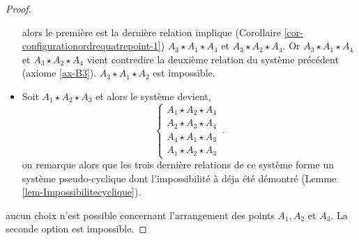 \begin{cor}
\begin{proof}
\begin{itemize}[$\bullet$]
            alors le première est la dernière relation implique (Corollaire \ref{cor-configurationordrequatrepoint-1}) $A_3 \star A_1 \star A_4$ et $A_3 \star A_2 \star A_4$. Or  $A_3 \star A_1 \star A_4$ et $A_3 \star A_2 \star A_4$ vient contredire la deuxième relation du système précédent (axiome \ref{ax-B3}). $A_3 \star A_1 \star A_2$ est impossible.
            \item Soit $A_1 \star A_2 \star A_3$ et alors le système devient,
            \begin{equation*}
            \left\{
            \begin{array}{c}
                 A_1 \star A_2 \star A_4 \\
                 A_2 \star A_3 \star A_4 \\
                 A_4 \star A_1 \star A_3 \\
                 A_1 \star A_2 \star A_3
            \end{array}
            \right. \,.
            \end{equation*}
            on remarque alors que les trois dernière relations de ce système forme un système pseudo-cyclique dont l'impossibilité à déja été démontré (Lemme \ref{lem-Impossibilitecyclique}). 
        \end{itemize}
        aucun choix n'est possible concernant l'arrangement des points $A_1,A_2$ et $A_3$. La seconde option est impossible.


\end{proof}
\end{cor}
